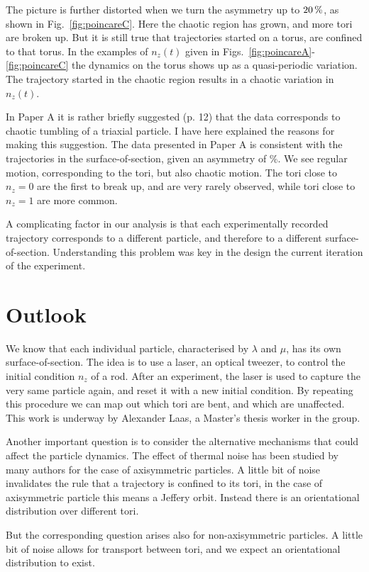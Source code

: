\documentclass[thesis.tex]{subfiles}
\begin{document}
The picture is further distorted when we turn the asymmetry up to $\unit[20]{\%}$, as shown in Fig.~\ref{fig:poincareC}. Here the chaotic region has grown, and more tori are broken up. But it is still true that trajectories started on a torus, are confined to that torus. In the examples of $n_z(t)$ given in Figs.~\ref{fig:poincareA}-\ref{fig:poincareC} the dynamics on the torus shows up as a quasi-periodic variation. The trajectory started in the chaotic region results in a chaotic variation in $n_z(t)$.

In Paper A it is rather briefly suggested (p. 12) that the data corresponds to chaotic tumbling of a triaxial particle. I have here explained the reasons for making this suggestion. The data presented in Paper A is consistent with the trajectories in the surface-of-section, given an asymmetry of \unit[10-30]{\%}. We see regular motion, corresponding to the tori, but also chaotic motion. The tori close to $n_z=0$ are the first to break up, and are very rarely observed, while tori close to $n_z=1$ are more common. 

A complicating factor in our analysis is that each experimentally recorded trajectory corresponds to a different particle, and therefore to a different surface-of-section. Understanding this problem was key in the design the current iteration of the experiment.

\section{Outlook}

We know that each individual particle, characterised by $\lambda$ and $\mu$, has its own surface-of-section. The idea is to use a laser, an optical tweezer, to control the initial condition $n_z$ of a rod. After an experiment, the laser is used to capture the very same particle again, and reset it with a new initial condition. By repeating this procedure we can map out which tori are bent, and which are unaffected. This work is underway by Alexander Laas, a Master's thesis worker in the group.

Another important question is to consider the alternative mechanisms that could affect the particle dynamics. The effect of thermal noise has been studied by many authors for the case of axisymmetric particles. A little bit of noise invalidates the rule that a trajectory is confined to its tori, in the case of axisymmetric particle this means a Jeffery orbit. Instead there is an orientational distribution over different tori.

But the corresponding question arises also for non-axisymmetric particles. A little bit of noise allows for transport between tori, and we expect an orientational distribution to exist.
\end{document}
